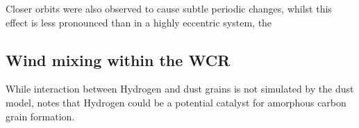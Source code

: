 
Closer orbits were also observed to cause subtle periodic changes, whilst this effect is less pronounced than in a highly eccentric system, the 


\subsection{Wind mixing within the WCR}


While interaction between Hydrogen and dust grains is not simulated by the dust model, \cite{leteuffModelDustFormation2002} notes that Hydrogen could be a potential catalyst for amorphous carbon grain formation.



